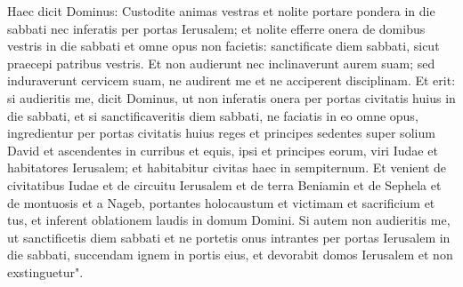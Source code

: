 \begin{biblechapter}
\verse Haec dicit Dominus: Custodite animas vestras et nolite portare pondera in die sabbati nec inferatis per portas Ierusalem; 
\verse et nolite efferre onera de domibus vestris in die sabbati et omne opus non facietis: sanctificate diem sabbati, sicut praecepi patribus vestris. 
\verse Et non audierunt nec inclinaverunt aurem suam; sed induraverunt cervicem suam, ne audirent me et ne acciperent disciplinam. 
\verse Et erit: si audieritis me, dicit Dominus, ut non inferatis onera per portas civitatis huius in die sabbati, et si sanctificaveritis diem sabbati, ne faciatis in eo omne opus, 
\verse ingredientur per portas civitatis huius reges et principes sedentes super solium David et ascendentes in curribus et equis, ipsi et principes eorum, viri Iudae et habitatores Ierusalem; et habitabitur civitas haec in sempiternum. 
\verse Et venient de civitatibus Iudae et de circuitu Ierusalem et de terra Beniamin et de Sephela et de montuosis et a Nageb, portantes holocaustum et victimam et sacrificium et tus, et inferent oblationem laudis in domum Domini. 
\verse Si autem non audieritis me, ut sanctificetis diem sabbati et ne portetis onus intrantes per portas Ierusalem in die sabbati, succendam ignem in portis eius, et devorabit domos Ierusalem et non exstinguetur". 
\end{biblechapter}

